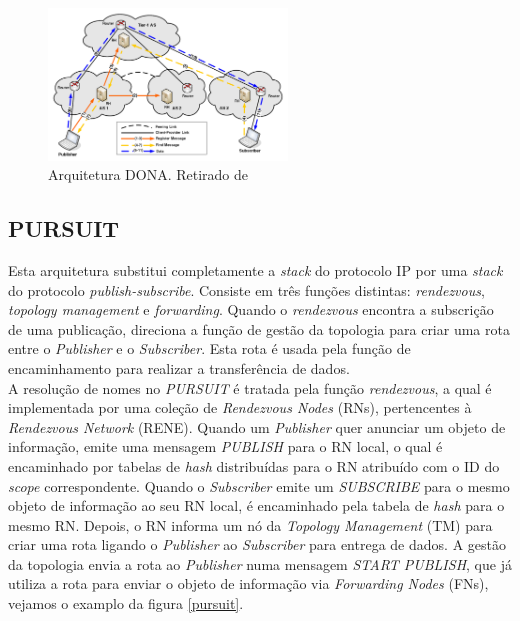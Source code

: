 \documentclass[conference]{IEEEtran}
\begin{document}



\begin{figure}[!t]
\centering
\includegraphics[width=2.5in]{dona}
\caption{Arquitetura DONA. Retirado de \cite{surveyICN}}
\label{dona}
\end{figure}

\subsection{PURSUIT}

Esta arquitetura substitui completamente a \textit{stack} do protocolo IP por uma \textit{stack} do protocolo \textit{publish-subscribe}. Consiste em tr\^{e}s fun\c{c}\~{o}es distintas: \textit{rendezvous}, \textit{topology management} e \textit{forwarding}.
Quando o \textit{rendezvous} encontra a subscri\c{c}\~{a}o de uma publica\c{c}\~{a}o, direciona a fun\c{c}\~{a}o de gest\~{a}o da topologia para criar uma rota entre o \textit{Publisher} e o \textit{Subscriber}. Esta rota \'{e} usada pela fun\c{c}\~{a}o de encaminhamento para realizar a transfer\^{e}ncia de dados.\\

A resolu\c{c}\~{a}o de nomes no \textit{PURSUIT} \'{e} tratada pela fun\c{c}\~{a}o \textit{rendezvous}, a qual \'{e} implementada por uma cole\c{c}\~{a}o de \textit{Rendezvous Nodes} (RNs), pertencentes \`{a} \textit{Rendezvous Network} (RENE). Quando um \textit{Publisher} quer anunciar um objeto de informa\c{c}\~{a}o, emite uma mensagem \textit{PUBLISH} para o RN local, o qual \'{e} encaminhado por tabelas de \textit{hash} distribu\'{i}das para o RN atribu\'{i}do com o ID do \textit{scope} correspondente. Quando o \textit{Subscriber} emite um \textit{SUBSCRIBE} para o mesmo objeto de informa\c{c}\~{a}o ao seu RN local, \'{e} encaminhado pela tabela de \textit{hash} para o mesmo RN. Depois, o RN informa um n\'{o} da \textit{Topology Management} (TM) para criar uma rota ligando o \textit{Publisher} ao \textit{Subscriber} para entrega de dados. A gest\~{a}o da topologia envia a rota ao \textit{Publisher} numa mensagem \textit{START PUBLISH}, que j\'{a} utiliza a rota para enviar o objeto de informa\c{c}\~{a}o via \textit{Forwarding Nodes} (FNs), vejamos o examplo da figura \ref{pursuit}.\\
\end{document}
